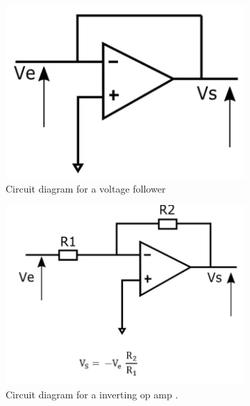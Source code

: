 \begin{figure}[H]
\footnotesize
\centering
\begin{subfigure}[]{0.45\textwidth}
\includegraphics[width=\linewidth]{./Figures/Follower.png}
\caption{Circuit diagram for a voltage follower\cite{Fund_Opamps}}
\label{subfig:linear_circuit_diagram}	
\end{subfigure}
\begin{subfigure}[]{0.45\textwidth}
\includegraphics[width=\linewidth]{./Figures/Inverting.png}
\caption{Circuit diagram for a inverting op amp \cite{Fund_Opamps}.} 			\label{subfig:switchmode_circuit_diagram}	
\end{subfigure}
\begin{subfigure}[]{0.45\textwidth}

\end{subfigure}
\end{figure}
